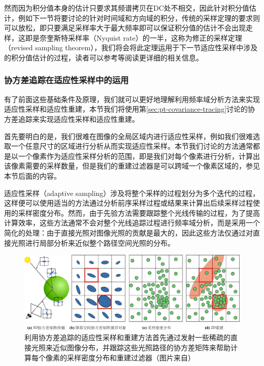 然而因为积分值本身的估计只要求其频谱拷贝在DC处不相交，因此针对积分值估计，例如下一节将要讨论的针对时间域和方向域的积分，传统的采样定理的要求则可以放松，即只要满足采样率大于最大频率即可以保证积分值的估计不会出现走样，这即是奈奎斯特采样率（Nyquist rate）的一半，这称为修正的采样定理（revised sampling theorem），我们将会将此定理运用于下一节适应性采样中涉及的积分值估计的过程，读者可以参考\cite{a:AFrequencyAnalysisofMonteCarloandotherNumericalIntegrationSchemes,a:5DCovarianceTracingforEfficientDefocusandMotionBlur}等阅读更详细的相关信息。





\subsubsection{协方差追踪在适应性采样中的运用}
有了前面这些基础条件及原理，我们就可以更好地理解利用频率域分析方法来实现适应性采样和适应性重建，本节我们将使用第\ref{sec:pt-covariance-tracing}讨论的协方差追踪来实现适应性采样和适应性重建。

首先要明白的是，我们很难在图像的全局区域内进行适应性采样，例如我们很难选取一个任意尺寸的区域进行分析从而实现适应性采样。本节我们讨论的方法通常都是以一个像素作为适应性采样分析的范围，即是我们对每个像素进行分析，计算出该像素需要的采样数量，但是我们的重建过滤器是可以跨域一个像素区域的，参见本节后面的内容。

适应性采样（adaptive sampling）涉及将整个采样的过程划分为多个迭代的过程，这样便可以使用适当的方法通过分析前序采样过程或结果来计算出后续采样过程使用的采样密度分布。然而，由于先验方法需要跟踪整个光线传输的过程，为了提高计算效率，这些方法通常不会对整个光线追踪过程进行频率域分析，而是采用一个简化的处理：由于直接光照对图像光照的贡献是最大的，因此这些方法仅通过对直接光照进行局部分析来近似整个路径空间光照的分布。

\begin{figure}
\begin{fullwidth}
	\includegraphics[width=1.\thewidth]{figures/pt/adaptive-sampling}
	\caption{利用协方差追踪的适应性采样和重建方法首先通过发射一些稀疏的直接光照来近似图像分布，并跟踪这些光照路径的协方差矩阵来帮助计算每个像素的采样密度分布和重建过滤器（图片来自\cite{a:5DCovarianceTracingforEfficientDefocusandMotionBlur}）}
	\label{f:pt-adaptive-sampling}
\end{fullwidth}
\end{figure}

